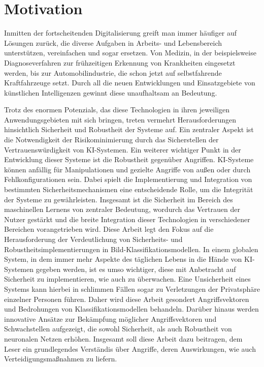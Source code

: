 \section{Motivation} \label{chpt:Einleitung_Motivation}

Inmitten der fortscheitenden Digitalisierung greift man immer häufiger auf Lösungen zurück, die diverse Aufgaben in Arbeits- und Lebensbereich unterstützen, vereinfachen und sogar ersetzen. Von Medizin, in der beispielsweise Diagnoseverfahren zur frühzeitigen Erkennung von Krankheiten eingesetzt werden, bis zur Automobilindustrie, die schon jetzt auf selbstfahrende Kraftfahrzeuge setzt. Durch all die neuen Entwicklungen und Einsatzgebiete von künstlichen Intelligenzen gewinnt diese unaufhaltsam an Bedeutung.

Trotz des enormen Potenzials, das diese Technologien in ihren jeweiligen Anwendungsgebieten mit sich bringen, treten vermehrt Herausforderungen hinsichtlich Sicherheit und Robustheit der Systeme auf. Ein zentraler Aspekt ist die Notwendigkeit der Risikominimierung durch das Sicherstellen der Vertrauenswürdigkeit von KI-Systemen.
Ein weiterer wichtiger Punkt in der Entwicklung dieser Systeme ist die Robustheit gegenüber Angriffen. KI-Systeme können anfällig für Manipulationen und gezielte Angriffe von außen oder durch Fehlkonfigurationen sein. Dabei spielt die Implementierung und Integration von bestimmten Sicherheitsmechanismen eine entscheidende Rolle, um die Integrität der Systeme zu gewährleisten.
Insgesamt ist die Sicherheit im Bereich des maschinellen Lernens von zentraler Bedeutung, wordurch das Vertrauen der Nutzer gestärkt und die breite Integration dieser Technologien in verschiedener Bereichen vorangetrieben wird.
Diese Arbeit legt den Fokus auf die Herausforderung der Verdeutlichung  von Sicherheits- und Robustheitsimplementierungen in Bild-Klassifikationsmodellen. In einem globalen System, in dem immer mehr Aspekte des täglichen Lebens in die \glqq Hände\grqq{} von KI-Systemen gegeben werden, ist es umso wichtiger, diese mit Anbetracht auf Sicherheit zu implementieren, wie auch zu überwachen. Eine Unsicherheit eines Systems kann hierbei in schlimmen Fällen sogar zu Verletzungen der Privatsphäre einzelner Personen führen. Daher wird diese Arbeit gesondert  Angriffsvektoren und Bedrohungen von Klassifikationsmodellen behandeln.
Darüber hinaus werden innovative Ansätze zur Bekämpfung möglicher Angriffsvektoren und Schwachstellen aufgezeigt, die sowohl Sicherheit, als auch Robustheit von neuronalen Netzen erhöhen. Insgesamt soll diese Arbeit dazu beitragen, dem Leser ein grundlegendes Verständis über Angriffe, deren Auswirkungen, wie auch Verteidigungsmaßnahmen zu liefern. 

